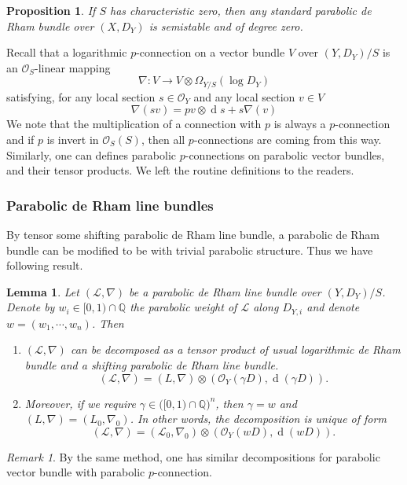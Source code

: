 \documentclass[12pt,twoside]{book}
\theoremstyle{plain}
\newtheorem{lemma}[lemma]{Lemma}
\newtheorem{proposition}[proposition]{Proposition}
\theoremstyle{definition}
\theoremstyle{remark}
\newtheorem{remark}[remark]{Remark}
\newcommand{\bQ}{{\mathbb Q}}
\newcommand{\mL}{{\mathcal L}}
\newcommand{\mO}{{\mathcal O}}
\DeclareMathOperator\rmd{d}
\numberwithin{equation}{section}
\begin{document}
\begin{proposition} If $S$ has characteristic zero, then any standard parabolic de Rham bundle over $(X,D_Y)$ is semistable and of degree zero.
\end{proposition}

Recall that a logarithmic $p$-connection on a vector bundle $V$ over $(Y,D_Y)/S$ is an $\mO_S$-linear mapping
\[\nabla \colon V \rightarrow V\otimes \Omega_{Y/S}(\log D_Y)\]
satisfying, for any local section $s \in \mO_Y$ and any local section $v\in V$
\[\nabla(sv) = p v\otimes \rmd s + s\nabla(v)\]
We note that the multiplication of a connection with $p$ is always a $p$-connection and if $p$ is invert in $\mO_S(S)$, then all $p$-connections are coming from this way.
Similarly, one can defines parabolic $p$-connections on parabolic vector bundles, and their tensor products. We left the routine definitions to the readers.


\subsubsection{Parabolic de Rham line bundles}

By tensor some shifting parabolic de Rham line bundle, a parabolic de Rham bundle can be modified to be with trivial parabolic structure. Thus we have following result.
\begin{lemma} Let $(\mL,\nabla)$ be a parabolic de Rham line bundle over $(Y,D_Y)/S$. Denote by $w_i\in [0,1)\cap \bQ$ the parabolic weight of $\mL$ along $D_{Y,i}$ and denote $w=(w_1,\cdots,w_n)$. Then
\begin{enumerate}
\item[$(1)$] $(\mL,\nabla)$ can be decomposed as a tensor product of usual logarithmic de Rham bundle and a shifting parabolic de Rham line bundle.
\[(\mL,\nabla) = (L,\nabla)\otimes (\mO_Y(\gamma D),\rmd(\gamma D)).\]
\item[$(2)$] Moreover, if we require $\gamma \in \Big([0,1)\cap \bQ\Big)^n$, then $\gamma=w$ and $(L,\nabla)=(L_0,\nabla_0)$. In other words, the decomposition is unique of form
\[(\mL,\nabla) = (\mL_0,\nabla_0) \otimes (\mO_Y(w D),\rmd(w D)).\]
\end{enumerate}
\end{lemma}


\begin{remark} By the same method, one has similar decompositions for parabolic vector bundle with parabolic $p$-connection.
\end{remark}
\end{document}
